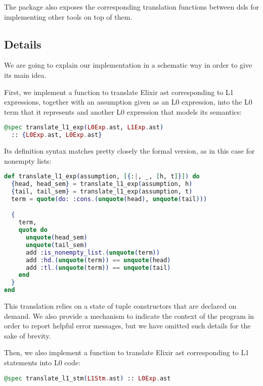 The package also exposes the corresponding translation functions between
\gls{dsl}s for implementing other tools on top of them.

\subsection{Details}
\label{ir:details}

We are going to explain our implementation in a schematic way in order to give
its main idea. 

First, we implement a function to translate Elixir \gls{ast} corresponding to L1
expressions, together with an assumption given as an L0 expression, into the L0
term that it represents and another L0 expression that models its semantics:

\begin{lstlisting}[language=elixir,numbers=none,frame=none]
@spec translate_l1_exp(L0Exp.ast, L1Exp.ast) 
  :: {L0Exp.ast, L0Exp.ast}
\end{lstlisting}

Its definition syntax matches pretty closely the formal version, as in this case
for nonempty lists:

\begin{lstlisting}[language=elixir,numbers=none,frame=none]
def translate_l1_exp(assumption, [{:|, _, [h, t]}]) do
  {head, head_sem} = translate_l1_exp(assumption, h)
  {tail, tail_sem} = translate_l1_exp(assumption, t)
  term = quote(do: :cons.(unquote(head), unquote(tail)))

  {
    term,
    quote do
      unquote(head_sem)
      unquote(tail_sem)
      add :is_nonempty_list.(unquote(term))
      add :hd.(unquote(term)) == unquote(head)
      add :tl.(unquote(term)) == unquote(tail)
    end
  }
end
\end{lstlisting}

This translation relies on a state of tuple constructors that are declared on 
demand. We also provide a mechanism to indicate the context of the program in
order to report helpful error messages, but we have omitted such details for the
sake of brevity. 

Then, we also implement a function to translate Elixir \gls{ast} corresponding
to L1 statements into L0 code:

\begin{lstlisting}[language=elixir,numbers=none,frame=none]
@spec translate_l1_stm(L1Stm.ast) :: L0Exp.ast
\end{lstlisting}

